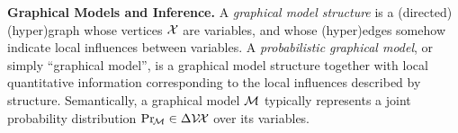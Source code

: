 \documentclass{article}
\newcommand\discard[1]{}
\begin{document}
\textbf{Graphical Models and Inference.}
A \emph{graphical model structure}
is a (directed) (hyper)graph whose vertices $\mathcal X$ are variables, and whose (hyper)edges somehow indicate local influences between variables.
A \emph{probabilistic graphical model},
or simply  ``graphical model'',
is a
graphical model structure
together with local quantitative information corresponding to the local influences described by structure.
%
Semantically,
a graphical model $\cal M$
typically
represents a joint probability distribution $\Pr_{\!\cal M}
 \in \Delta \mathcal V\!\mathcal X$ over its variables.
\discard{
Although there is often more to the story,
it can typically be
expressed as a product
$\Pr_{\cal M}(\X) \propto \prod_{E \in \Ed} \phi_{E}(E)$
of factors
$\boldsymbol\phi = 
\{ \phi_E : \V E \to \mathbb R_{\ge 0} \}_{E \in \Ed}$
over a hypergraph $(\X, \Ed)$ closely related to the structure of $\cal M$.
For this reason, some authors use the term ``graphical model'' to refer to a tuple $(\X ,\Ed, \boldsymbol\phi)$,
i.e., a factor graph.
PDGs, however, do not represent probabilities this way.}
\end{document}
